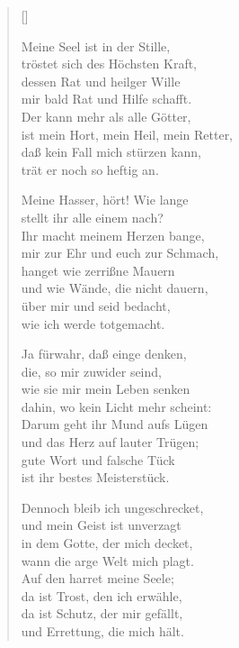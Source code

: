 \begin{multicols}{2}
\settowidth{\versewidth}{Meine Hasser, hört! Wie lange}
\begin{verse}[\versewidth]

 Meine Seel ist in der Stille,\\
tröstet sich des Höchsten Kraft,\\
dessen Rat und heilger Wille\\
mir bald Rat und Hilfe schafft.\\
Der kann mehr als alle Götter,\\
ist mein Hort, mein Heil, mein Retter,\\
daß kein Fall mich stürzen kann,\\
trät er noch so heftig an.

 Meine Hasser, hört! Wie lange\\
stellt ihr alle einem nach?\\
Ihr macht meinem Herzen bange,\\
mir zur Ehr und euch zur Schmach,\\
hanget wie zerrißne Mauern\\
und wie Wände, die nicht dauern,\\
über mir und seid bedacht,\\
wie ich werde totgemacht.

 Ja fürwahr, daß einge denken,\\
die, so mir zuwider seind,\\
wie sie mir mein Leben senken\\
dahin, wo kein Licht mehr scheint:\\
Darum geht ihr Mund aufs Lügen\\
und das Herz auf lauter Trügen;\\
gute Wort und falsche Tück\\
ist ihr bestes Meisterstück.

 Dennoch bleib ich ungeschrecket,\\
und mein Geist ist unverzagt\\
in dem Gotte, der mich decket,\\
wann die arge Welt mich plagt.\\
Auf den harret meine Seele;\\
da ist Trost, den ich erwähle,\\
da ist Schutz, der mir gefällt,\\
und Errettung, die mich hält.


\end{verse}
\end{multicols}
